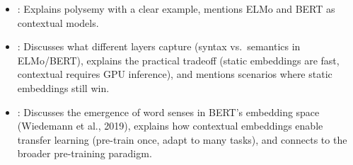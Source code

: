 \begin{interviewq}

\goodgreat
\begin{itemize}
    \item {}: Explains polysemy with a clear example,
    mentions ELMo and BERT as contextual models.
    \item {}: Discusses what different layers capture (syntax
    vs.\ semantics in ELMo/BERT), explains the practical tradeoff (static
    embeddings are fast, contextual requires GPU inference), and mentions
    scenarios where static embeddings still win.
    \item {}: Discusses the emergence of word senses in
    BERT's embedding space (Wiedemann et al., 2019), explains how
    contextual embeddings enable transfer learning (pre-train once, adapt to
    many tasks), and connects to the broader pre-training paradigm.
\end{itemize}

\end{interviewq}

\vspace{0.5em}

